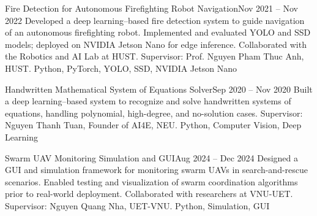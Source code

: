 %
%
%


\begin{projects}
\project
{Fire Detection for Autonomous Firefighting Robot Navigation}{Nov 2021 -- Nov 2022}
{}
{Developed a deep learning--based fire detection system to guide navigation of an autonomous firefighting robot. Implemented and evaluated YOLO and SSD models; deployed on NVIDIA Jetson Nano for edge inference. 
Collaborated with the Robotics and AI Lab at HUST. 
Supervisor: Prof. Nguyen Pham Thuc Anh, HUST.}
{Python, PyTorch, YOLO, SSD, NVIDIA Jetson Nano}

\project
{Handwritten Mathematical System of Equations Solver}{Sep 2020 -- Nov 2020}
{}
{Built a deep learning--based system to recognize and solve handwritten systems of equations, handling polynomial, high-degree, and no-solution cases. 
Supervisor: Nguyen Thanh Tuan, Founder of AI4E, NEU.}
{Python, Computer Vision, Deep Learning}

\project
{Swarm UAV Monitoring Simulation and GUI}{Aug 2024 -- Dec 2024}
{}
{Designed a GUI and simulation framework for monitoring swarm UAVs in search-and-rescue scenarios. Enabled testing and visualization of swarm coordination algorithms prior to real-world deployment. Collaborated with researchers at VNU-UET. Supervisor: Nguyen Quang Nha, UET-VNU.}
{Python, Simulation, GUI}

\end{projects}